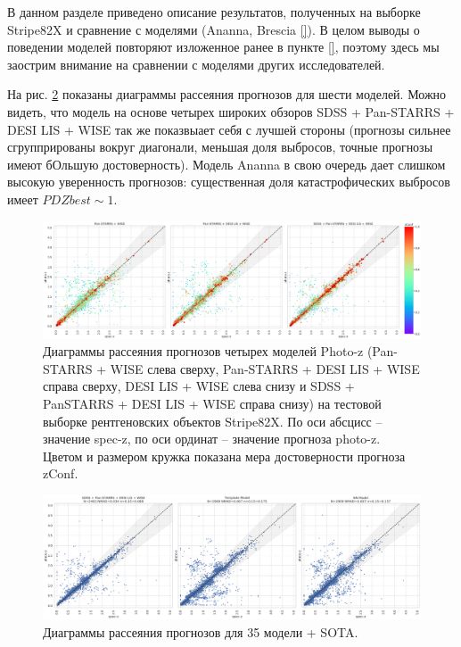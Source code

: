 \documentclass[fleqn,usenatbib]{mnras}
\begin{document}
В данном разделе приведено описание результатов, полученных на выборке Stripe82X и сравнение с моделями (Ananna, Brescia \ref{}). В целом выводы о поведении моделей повторяют изложенное ранее в пункте \ref{}, поэтому здесь мы заострим внимание на сравнении с моделями других исследователей.

На рис. \ref{fig:s82x} показаны диаграммы рассеяния прогнозов для шести моделей. Можно видеть, что модель на основе четырех широких обзоров SDSS + Pan-STARRS + DESI LIS + WISE так же показвыает себя с лучшей стороны (прогнозы сильнее сгруппрированы вокруг диагонали, меньшая доля выбросов, точные прогнозы имеют бОльшую достоверность). Модель Ananna в свою очередь дает слишком высокую уверенность прогнозов: существенная доля катастрофических выбросов имеет $PDZbest \sim 1$.


\begin{figure}
    \centering
    \includegraphics[width=0.9\linewidth]{images/scatterplots-stripe82x.png}
    \caption{Диаграммы рассеяния прогнозов четырех моделей Photo-z (Pan-STARRS + WISE слева сверху, Pan-STARRS + DESI LIS + WISE справа сверху, DESI LIS + WISE слева снизу и SDSS + PanSTARRS + DESI LIS + WISE справа снизу) на тестовой выборке рентгеновских объектов Stripe82X. По оси абсцисс -- значение spec-z, по оси ординат -- значение прогноза photo-z. Цветом и размером кружка показана мера достоверности прогноза zConf.}
    \label{fig:s82x}
\end{figure}

\begin{figure}
    \centering
    \includegraphics[width=0.9\linewidth]{images/scatterplots-stripe82x-sota.png}
    \caption{Диаграммы рассеяния прогнозов для 35 модели + SOTA.}
    \label{fig:s82x}
\end{figure}
\end{document}
